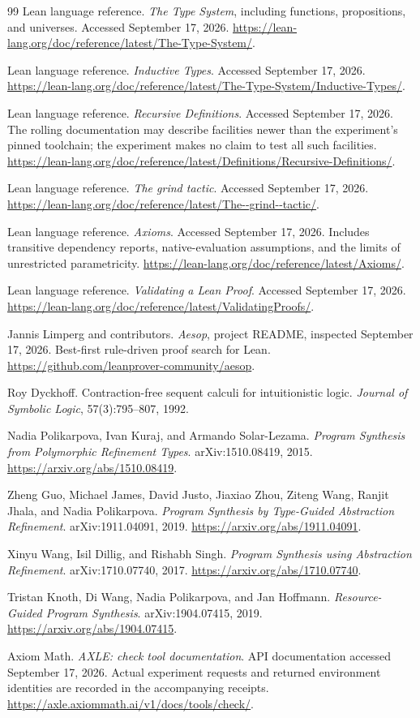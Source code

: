 \begin{thebibliography}{99}
 Lean language reference.
\emph{The Type System}, including functions, propositions, and universes. Accessed September 17, 2026.
\url{https://lean-lang.org/doc/reference/latest/The-Type-System/}.

 Lean language reference.
\emph{Inductive Types}. Accessed September 17, 2026.
\url{https://lean-lang.org/doc/reference/latest/The-Type-System/Inductive-Types/}.

 Lean language reference.
\emph{Recursive Definitions}. Accessed September 17, 2026. The rolling documentation may describe facilities newer than the experiment's pinned toolchain; the experiment makes no claim to test all such facilities.
\url{https://lean-lang.org/doc/reference/latest/Definitions/Recursive-Definitions/}.

 Lean language reference.
\emph{The grind tactic}. Accessed September 17, 2026.
\url{https://lean-lang.org/doc/reference/latest/The--grind--tactic/}.

 Lean language reference.
\emph{Axioms}. Accessed September 17, 2026. Includes transitive dependency reports, native-evaluation assumptions, and the limits of unrestricted parametricity.
\url{https://lean-lang.org/doc/reference/latest/Axioms/}.

 Lean language reference.
\emph{Validating a Lean Proof}. Accessed September 17, 2026.
\url{https://lean-lang.org/doc/reference/latest/ValidatingProofs/}.

 Jannis Limperg and contributors.
\emph{Aesop}, project README, inspected September 17, 2026. Best-first rule-driven proof search for Lean.
\url{https://github.com/leanprover-community/aesop}.

 Roy Dyckhoff.
Contraction-free sequent calculi for intuitionistic logic.
\emph{Journal of Symbolic Logic}, 57(3):795--807, 1992.

 Nadia Polikarpova, Ivan Kuraj, and Armando Solar-Lezama.
\emph{Program Synthesis from Polymorphic Refinement Types}.
arXiv:1510.08419, 2015.
\url{https://arxiv.org/abs/1510.08419}.

 Zheng Guo, Michael James, David Justo, Jiaxiao Zhou, Ziteng Wang, Ranjit Jhala, and Nadia Polikarpova.
\emph{Program Synthesis by Type-Guided Abstraction Refinement}.
arXiv:1911.04091, 2019.
\url{https://arxiv.org/abs/1911.04091}.

 Xinyu Wang, Isil Dillig, and Rishabh Singh.
\emph{Program Synthesis using Abstraction Refinement}.
arXiv:1710.07740, 2017.
\url{https://arxiv.org/abs/1710.07740}.

 Tristan Knoth, Di Wang, Nadia Polikarpova, and Jan Hoffmann.
\emph{Resource-Guided Program Synthesis}.
arXiv:1904.07415, 2019.
\url{https://arxiv.org/abs/1904.07415}.

 Axiom Math.
\emph{AXLE: check tool documentation}. API documentation accessed September 17, 2026. Actual experiment requests and returned environment identities are recorded in the accompanying receipts.
\url{https://axle.axiommath.ai/v1/docs/tools/check/}.
\end{thebibliography}
